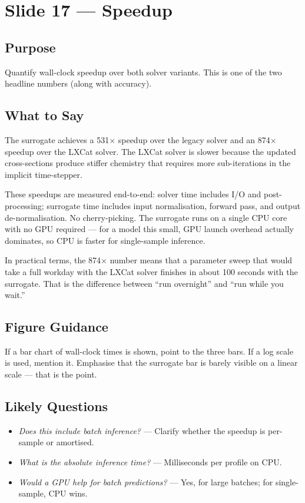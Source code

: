 \documentclass[12pt,a4paper]{article}
\begin{document}
\clearpage

\section{Slide 17 --- Speedup}
\label{sec:slide17}

\subsection*{Purpose}
Quantify wall-clock speedup over both solver variants. This is one
of the two headline numbers (along with accuracy).

\subsection*{What to Say}

The surrogate achieves a 531$\times$ speedup over the legacy solver
and an 874$\times$ speedup over the LXCat solver. The LXCat solver
is slower because the updated cross-sections produce stiffer
chemistry that requires more sub-iterations in the implicit
time-stepper.

These speedups are measured end-to-end: solver time includes I/O
and post-processing; surrogate time includes input normalisation,
forward pass, and output de-normalisation. No cherry-picking. The
surrogate runs on a single CPU core with no GPU required --- for a
model this small, GPU launch overhead actually dominates, so CPU is
faster for single-sample inference.

In practical terms, the 874$\times$ number means that a parameter
sweep that would take a full workday with the LXCat solver finishes
in about 100 seconds with the surrogate. That is the difference
between ``run overnight'' and ``run while you wait.''

\subsection*{Figure Guidance}
If a bar chart of wall-clock times is shown, point to the three bars.
If a log scale is used, mention it. Emphasise that the surrogate bar
is barely visible on a linear scale --- that is the point.

\subsection*{Likely Questions}
\begin{itemize}
  \item \emph{Does this include batch inference?}
    --- Clarify whether the speedup is per-sample or amortised.
  \item \emph{What is the absolute inference time?}
    --- Milliseconds per profile on CPU.
  \item \emph{Would a GPU help for batch predictions?}
    --- Yes, for large batches; for single-sample, CPU wins.
\end{itemize}
\end{document}

